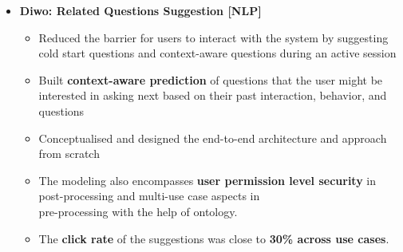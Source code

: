 \documentclass[a4paper,10pt]{article}
\newcommand{\isep}{-2 pt}
\begin{document}
\begin{itemize}
    
    
\item \textbf{Diwo: Related Questions Suggestion [NLP]} 
    \\[-0.6cm]
    \begin{itemize}\itemsep \isep
    	\item Reduced the barrier for users to interact with the system by suggesting cold start questions and context-aware questions during an active session 
        \item Built \textbf{context-aware prediction} of questions that the user might be interested in asking next based on their past interaction, behavior, and questions
        \item Conceptualised and designed the end-to-end architecture and approach from scratch 
        \item The modeling also encompasses \textbf{user permission level security} in post-processing and multi-use case aspects in \\ pre-processing with the help of ontology. 
        \item The \textbf{click rate} of the suggestions was close to \textbf{30\% across use cases}.
        \\ [-0.5cm]
    \end{itemize}



\end{itemize}
\end{document}

